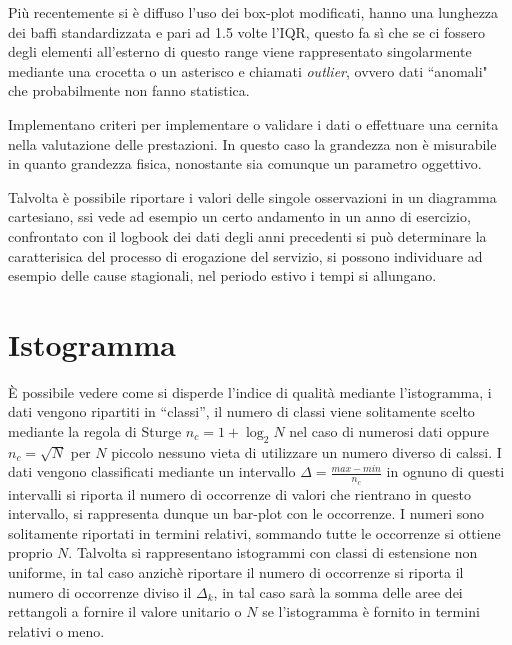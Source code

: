 Più recentemente si è diffuso l'uso dei box-plot modificati, hanno una 
lunghezza dei baffi standardizzata e pari ad 1.5 volte l'IQR, questo fa sì che 
se ci fossero degli elementi all'esterno di questo range viene rappresentato 
singolarmente mediante una crocetta o un asterisco e chiamati \textit{outlier}, 
ovvero dati ``anomali" che probabilmente non fanno statistica.

Implementano criteri per implementare o validare i dati o effettuare una 
cernita nella valutazione delle prestazioni. In questo caso la grandezza non è 
misurabile in quanto grandezza fisica, nonostante sia comunque un parametro 
oggettivo.


Talvolta è possibile riportare i valori delle singole osservazioni in un 
diagramma cartesiano, ssi vede ad esempio un certo andamento in un anno di 
esercizio, confrontato con il logbook dei dati degli anni precedenti si può 
determinare la caratterisica del processo di erogazione del servizio, si 
possono individuare ad esempio delle cause stagionali, nel periodo estivo i 
tempi si allungano.

\section{Istogramma}
È possibile vedere come si disperde l'indice di qualità mediante l'istogramma, 
i dati vengono ripartiti in ``classi'', il numero di classi viene solitamente 
scelto mediante la regola di Sturge $n_c = 1 + \log_2 N$ nel caso di numerosi 
dati oppure $n_c = \sqrt{N}$ per $N$ piccolo nessuno vieta di utilizzare un 
numero diverso di calssi.
I dati vengono classificati mediante un intervallo $\Delta = \frac{max-min}{n_c}
$ in ognuno di questi intervalli si riporta il numero di occorrenze di valori 
che rientrano in questo intervallo, si rappresenta dunque un bar-plot con le 
occorrenze.
I numeri sono solitamente riportati in termini relativi, sommando tutte le 
occorrenze si ottiene proprio $N$.
Talvolta si rappresentano istogrammi con classi di estensione non uniforme, in 
tal caso anzichè riportare il numero di occorrenze si riporta il numero di 
occorrenze diviso il $\Delta_k$, in tal caso sarà la somma delle aree dei 
rettangoli a fornire il valore unitario o $N$ se l'istogramma è fornito in 
termini relativi o meno.




